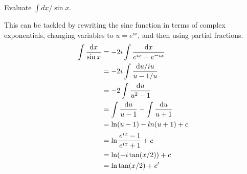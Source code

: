 \begin{eg}
\egquestion Evaluate $\int dx/\sin x$.

\eganswer
This can be tackled by rewriting the sine function in terms of complex exponentials, changing variables
to $u=e^{ix}$, and then using partial fractions.
\begin{align*}
  \int \frac{\textup{d} x}{\sin x} &= -2i \int \frac{\textup{d} x}{e^{ix}-e^{-ix}} \\
                             &= -2i \int \frac{\textup{d} u/iu}{u-1/u} \\
                             &= -2\int \frac{\textup{d} u}{u^2-1} \\
                             &= \int \frac{\textup{d} u}{u-1} - \int \frac{\textup{d} u}{u+1} \\
                             &= \ln(u-1)-ln(u+1) +c \\
                             &= \ln \frac{e^{ix}-1}{e^{ix}+1} +c \\
                             &= \ln(-i\tan(x/2)) +c \\
                             &= \ln\tan(x/2)+ c'
\end{align*}
\end{eg}

